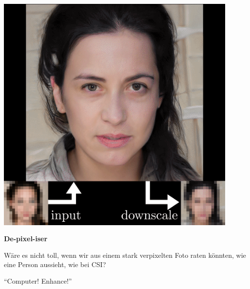 \documentclass[aspectratio=169,usenames,dvipsnames]{beamer}
\begin{document}
\begin{frame}
\begin{minipage}{.5\textwidth}
\includegraphics[width=0.9\textwidth, keepaspectratio]{images/step4}
\end{minipage}\begin{minipage}{.5\textwidth}
\textbf{De-pixel-iser}
\bigskip

Wäre es nicht toll, wenn wir aus einem stark verpixelten Foto raten könnten, wie eine Person aussieht, wie bei CSI?
\bigskip

``Computer! Enhance!''
\end{minipage}
\end{frame}
\end{document}

